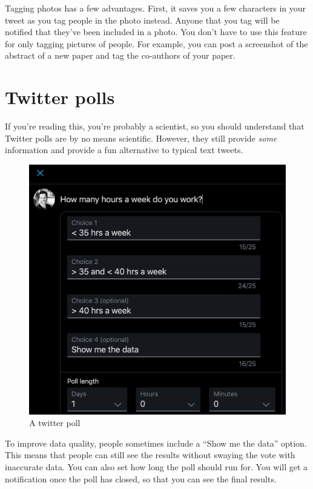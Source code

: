 \documentclass[
]{book}
\begin{document}
Tagging photos has a few advantages. First, it saves you a few characters in your tweet as you tag people in the photo instead. Anyone that you tag will be notified that they've been included in a photo. You don't have to use this feature for only tagging pictures of people. For example, you can post a screenshot of the abstract of a new paper and tag the co-authors of your paper.

\hypertarget{twitter-polls}{%
\section*{Twitter polls}\label{twitter-polls}}

If you're reading this, you're probably a scientist, so you should understand that Twitter polls are by no means scientific. However, they still provide \emph{some} information and provide a fun alternative to typical text tweets.

\begin{figure}

{\centering \includegraphics[width=0.8\linewidth]{images/poll} 

}

\caption{A twitter poll}\label{fig:unnamed-chunk-12}
\end{figure}

To improve data quality, people sometimes include a ``Show me the data'' option. This means that people can still see the results without swaying the vote with inaccurate data. You can also set how long the poll should run for. You will get a notification once the poll has closed, so that you can see the final results.
\end{document}
